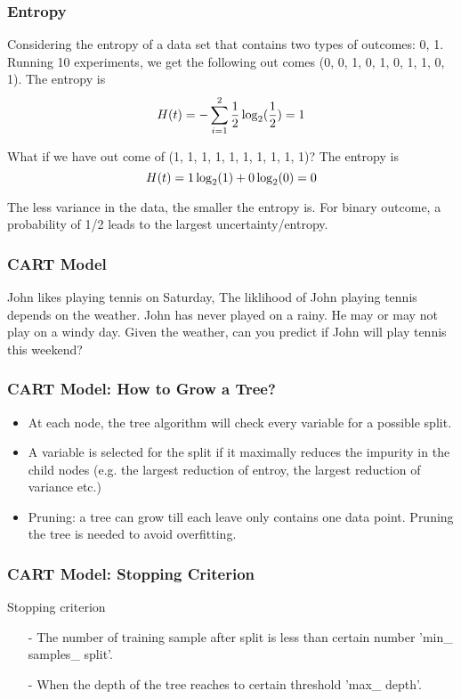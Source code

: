 \documentclass[notheorems, aspectratio=54]{beamer}
\begin{document}
\begin{frame}
    \frametitle{Entropy}
    Considering the entropy of a data set that contains two types of outcomes: {0, 1}. Running 10 experiments, we get the following out comes (0, 0, 1, 0, 1, 0, 1, 1, 0, 1). The entropy is 
    $$
    \mathnormal{ H(t)}=-\sum\limits_{i=1}^{2}\frac{1}{2}\log_2(\frac{1}{2})=1
    $$
    
What if we have out come of (1, 1, 1, 1, 1, 1, 1, 1, 1, 1)? The entropy is 
    $$
    \mathnormal{H(t)}=1\log_2(1)+0\log_2(0)=0
    $$

The less variance in the data, the smaller the entropy is. For binary outcome, a probability of 1/2 leads to the largest uncertainty/entropy.

\end{frame}

\begin{frame}
\frametitle{CART Model}
John likes playing tennis on Saturday, The liklihood of John playing tennis depends on the weather. John has never played on a rainy. He may or may not play on a windy day. Given the weather, can you predict if John will play tennis this weekend?

\begin{center}
\end{center}
\end{frame}

\begin{frame}
\frametitle{CART Model: How to Grow a Tree?}
\begin{itemize}
\item At each node, the tree algorithm will check every variable for a possible split. 
\item A variable is selected for the split if it maximally reduces the impurity in the child nodes (e.g. the largest reduction of entroy, the largest reduction of variance etc.)
\item Pruning: a tree can grow till each leave only contains one data point. Pruning the tree is needed to avoid overfitting.
\end{itemize}
\end{frame}

\begin{frame}
\frametitle{CART Model: Stopping Criterion}
Stopping criterion
\begin{itemize}
\item[-] The number of training sample after split is less than certain number 'min\_ samples\_ split'.
\item[-] When the depth of the tree reaches to certain threshold 'max\_ depth'.
\end{itemize}
\end{frame}
\end{document}

